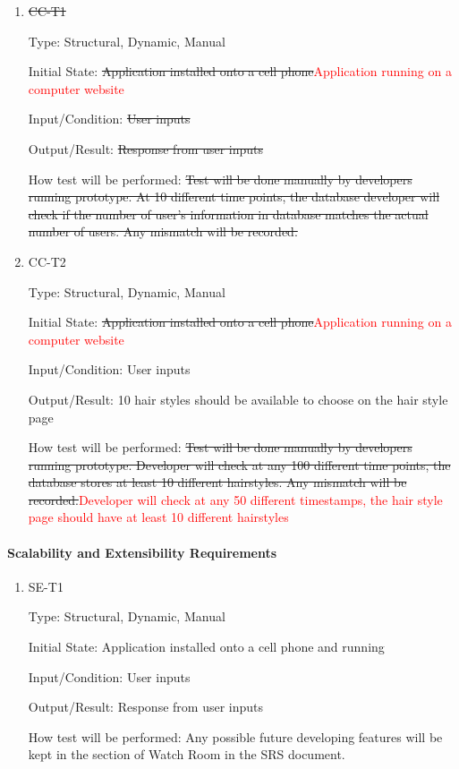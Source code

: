 \documentclass[12pt, titlepage]{article}
\begin{document}
\begin{enumerate}

\item{\sout{CC-T1}\\}

Type: Structural, Dynamic, Manual
					
Initial State: \sout{Application installed onto a cell phone}\textcolor{red}{Application running on a computer website}
					
Input/Condition: \sout{User inputs}
					
Output/Result: \sout{Response from user inputs}
					
How test will be performed: \sout{Test will be done manually by developers running prototype. At 10 different time points, the database developer will check if the number of user's information in database matches the actual number of users. Any mismatch will be recorded.}
					
\item{CC-T2\\}

Type: Structural, Dynamic, Manual
					
Initial State: \sout{Application installed onto a cell phone}\textcolor{red}{Application running on a computer website}
					
Input/Condition: User inputs
					
Output/Result: 10 hair styles should be available to choose on the hair style page
					
How test will be performed: \sout{Test will be done manually by developers running prototype. Developer will check at any 100 different time points, the database stores at least 10 different hairstyles. Any mismatch will be recorded.}\textcolor{red}{Developer will check at any 50 different timestamps, the hair style page should have at least 10 different hairstyles}

\end{enumerate}

\paragraph{Scalability and Extensibility Requirements}

\begin{enumerate}

\item{SE-T1\\}

Type: Structural, Dynamic, Manual
					
Initial State: Application installed onto a cell phone and running
					
Input/Condition: User inputs
					
Output/Result: Response from user inputs
					
How test will be performed: Any possible future developing features will be kept in the section of Watch Room in the SRS document.

\end{enumerate}
\end{document}
